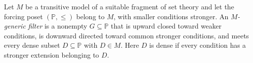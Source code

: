 
Let $M$ be a transitive model of a suitable fragment of set theory and let the forcing poset $(\mathbb P,\le)$ belong to $M$, with smaller conditions stronger. An \emph{$M$-generic filter} is a nonempty $G\subseteq\mathbb P$ that is upward closed toward weaker conditions, is downward directed toward common stronger conditions, and meets every dense subset $D\subseteq\mathbb P$ with $D\in M$. Here $D$ is dense if every condition has a stronger extension belonging to $D$.
